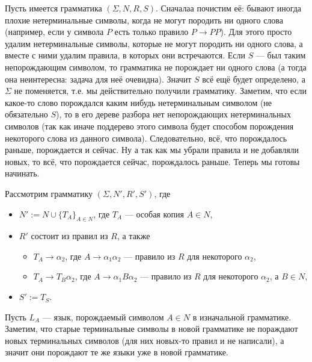\documentclass[12pt,a4paper]{article}
\begin{document}
    \begin{problem}{4}
        \newcommand{\Substrings}{\mathrm{Substrings}}
        \newcommand{\Postfix}{\mathrm{Postfix}}
        \newcommand{\Prefix}{\mathrm{Prefix}}
        \newcommand{\Rev}{\mathrm{Rev}}
        Пусть имеется грамматика $(\Sigma, N, R, S)$. Сначалаа почистим её: бывают иногда плохие нетерминальные символы, когда не могут породить ни одного слова (например, если у символа $P$ есть только правило $P \to PP$). Для этого просто удалим нетерминальные символы, которые не могут породить ни одного слова, а вместе с ними удалим правила, в которых они встречаются. Если $S$ --- был таким непорождающим символом, то грамматика не порождает ни одного слова (а тогда она неинтересна: задача для неё очевидна). Значит $S$ всё ещё будет определено, а $\Sigma$ не поменяется, т.е. мы действительно получили грамматику. Заметим, что если какое-то слово порождался каким нибудь нетерминальным символом (не обязательно $S$), то в его дереве разбора нет непорождающих нетерминальных символов (так как иначе поддерево этого символа будет способом порождения некоторого слова из данного символа). Следовательно, всё, что порождалось раньше, порождается и сейчас. Ну а так как мы убрали правила и не добавляли новых, то всё, что порождается сейчас, порождалось раньше. Теперь мы готовы начинать.
        
        Рассмотрим грамматику $(\Sigma, N', R', S')$, где
        \begin{itemize}
            \item $N' := N \cup \{T_A\}_{A \in N}$, где $T_A$ --- особая копия $A \in N$,
            \item $R'$ состоит из правил из $R$, а также
                \begin{itemize}
                    \item $T_A \to \alpha_2$, где $A \to \alpha_1\alpha_2$ --- правило из $R$ для некоторого $\alpha_2$,
                    \item $T_A \to T_B\alpha_2$, где $A \to \alpha_1B\alpha_2$ --- правило из $R$ для некоторого $\alpha_2$, а $B \in N$,
                \end{itemize}
            \item $S' := T_S$.
        \end{itemize}
        Пусть $L_A$ --- язык, порождаемый символом $A \in N$ в изначальной грамматике. Заметим, что старые терминальные символы в новой грамматике не пораждают новых терминальных символов (для них новых-то правил и не написали), а значит они порождают те же языки уже в новой грамматике.


\end{problem}
\end{document}
